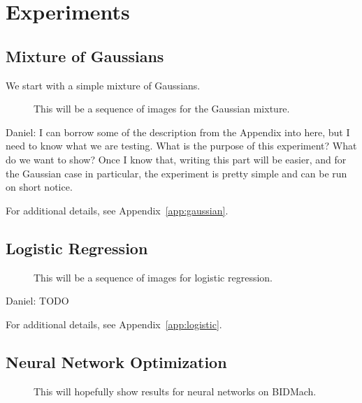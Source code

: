 \documentclass{article}
\begin{document}
\section{Experiments}\label{sec:experiments}

\subsection{Mixture of Gaussians}\label{ssec:gaussians}

We start with a simple mixture of Gaussians.

\begin{figure}[ht]
  \centering
  \fbox{\rule[-.5cm]{0cm}{4cm} \rule[-.5cm]{4cm}{0cm}}
  \caption{This will be a sequence of images for the Gaussian mixture.}
\end{figure}

{\color{blue}
Daniel: I can borrow some of the description from the Appendix into here, but I need to know what we
are testing. What is the purpose of this experiment? What do we want to show? Once I know that,
writing this part will be easier, and for the Gaussian case in particular, the experiment is pretty
simple and can be run on short notice.

For additional details, see Appendix~\ref{app:gaussian}.
}

\subsection{Logistic Regression}\label{ssec:logistic}

\begin{figure}[ht]
  \centering
  \fbox{\rule[-.5cm]{0cm}{4cm} \rule[-.5cm]{4cm}{0cm}}
  \caption{This will be a sequence of images for logistic regression.}
\end{figure}

{\color{blue}
Daniel: TODO

For additional details, see Appendix~\ref{app:logistic}.
}

\subsection{Neural Network Optimization}\label{ssec:nets}

\begin{figure}[ht]
  \centering
  \fbox{\rule[-.5cm]{0cm}{4cm} \rule[-.5cm]{4cm}{0cm}}
  \caption{This will hopefully show results for neural networks on BIDMach.}
\end{figure}
\end{document}
